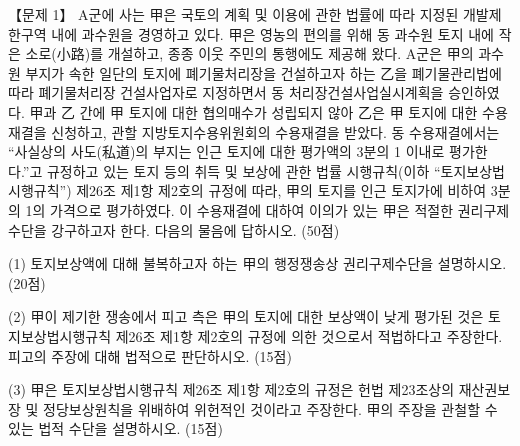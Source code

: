 \begin{longquestion}{【문제 1】}
A군에 사는 甲은 국토의 계획 및 이용에 관한 법률에 따라 지정된 개발제한구역 내에 과수원을 경영하고 있다. 甲은 영농의 편의를 위해 동 과수원 토지 내에 작은 소로(小路)를 개설하고, 종종 이웃 주민의 통행에도 제공해 왔다. A군은 甲의 과수원 부지가 속한 일단의 토지에 폐기물처리장을 건설하고자 하는 乙을 폐기물관리법에 따라 폐기물처리장 건설사업자로 지정하면서 동 처리장건설사업실시계획을 승인하였다. 甲과 乙 간에 甲 토지에 대한 협의매수가 성립되지 않아 乙은 甲 토지에 대한 수용재결을 신청하고, 관할 지방토지수용위원회의 수용재결을 받았다. 동 수용재결에서는 “사실상의 사도(私道)의 부지는 인근 토지에 대한 평가액의 3분의 1 이내로 평가한다.”고 규정하고 있는 토지 등의 취득 및 보상에 관한 법률 시행규칙(이하 “토지보상법시행규칙”) 제26조 제1항 제2호의 규정에 따라, 甲의 토지를 인근 토지가에 비하여 3분의 1의 가격으로 평가하였다. 이 수용재결에 대하여 이의가 있는 甲은 적절한 권리구제 수단을 강구하고자 한다. 다음의 물음에 답하시오. (50점) \par
\medskip\noindent (1) 토지보상액에 대해 불복하고자 하는 甲의 행정쟁송상 권리구제수단을 설명하시오. (20점) \par
\medskip\noindent (2) 甲이 제기한 쟁송에서 피고 측은 甲의 토지에 대한 보상액이 낮게 평가된 것은 토지보상법시행규칙 제26조 제1항 제2호의 규정에 의한 것으로서 적법하다고 주장한다. 피고의 주장에 대해 법적으로 판단하시오. (15점) \par
\medskip\noindent (3) 甲은 토지보상법시행규칙 제26조 제1항 제2호의 규정은 헌법 제23조상의 재산권보장 및 정당보상원칙을 위배하여 위헌적인 것이라고 주장한다. 甲의 주장을 관철할 수 있는 법적 수단을 설명하시오. (15점) \par
\end{longquestion}
